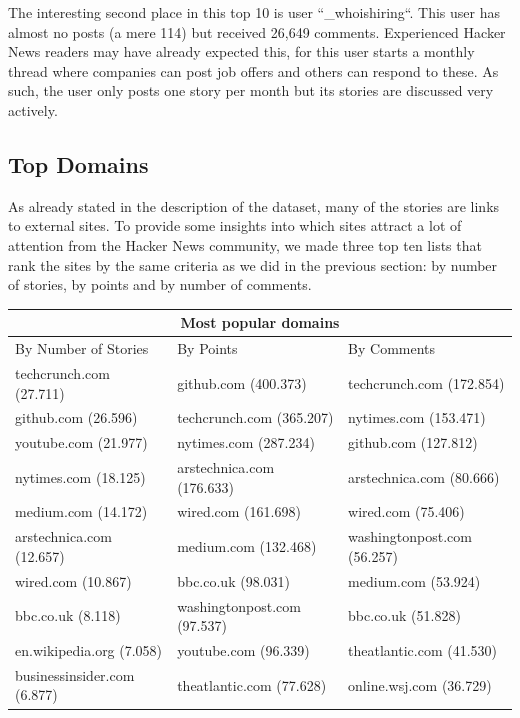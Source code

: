 The interesting second place in this top 10 is user ``\_whoishiring``. This user has almost no posts (a mere 114) but received 26,649 comments. Experienced Hacker News readers may have already expected this, for this user starts a monthly thread where companies can post job offers and others can respond to these. As such, the user only posts one story per month but its stories are discussed very actively.

\subsection{Top Domains}
As already stated in the description of the dataset, many of the stories are links to external sites. To provide some insights into which sites attract a lot of attention from the Hacker News community, we made three top ten lists that rank the sites by the same criteria as we did in the previous section: by number of stories, by points and by number of comments.

\begin{center}
    \begin{tabular}{|p{4.5cm}|p{=5cm}|p{5cm}|}
       \hline
       \multicolumn{3}{|c|}{Most popular domains} \\
       \hline
       By Number of Stories 			& By Points 									& By Comments \\
       \hline
       techcrunch.com (27.711) 	& github.com (400.373)		       & techcrunch.com (172.854) \\
		github.com (26.596) 			& techcrunch.com (365.207) 	   & nytimes.com (153.471) \\
		youtube.com (21.977) 		& nytimes.com (287.234)		   & github.com (127.812) \\
		nytimes.com (18.125) 		& arstechnica.com (176.633)	   & arstechnica.com (80.666) \\
		medium.com (14.172) 		& wired.com (161.698)		  	   & wired.com (75.406) \\
		arstechnica.com (12.657) 	& medium.com (132.468)		   & washingtonpost.com (56.257) \\
		wired.com (10.867) 			& bbc.co.uk (98.031)		  		   & medium.com (53.924) \\
		bbc.co.uk (8.118) 				& washingtonpost.com (97.537) & bbc.co.uk (51.828) \\
		en.wikipedia.org (7.058) 		& youtube.com (96.339)		  	   & theatlantic.com (41.530) \\
		businessinsider.com (6.877) & theatlantic.com (77.628)	   & online.wsj.com (36.729) \\
        \hline
    \end{tabular}
\end{center}

